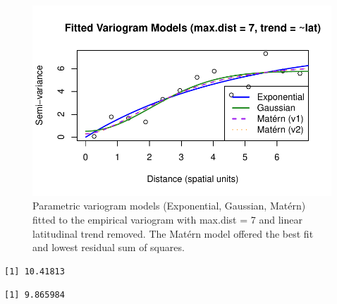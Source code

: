 \documentclass[
  11pt,
]{article}
\newenvironment{Shaded}{\begin{snugshade}}{\end{snugshade}}
\newcommand{\CommentTok}[1]{\textcolor[rgb]{0.37,0.37,0.37}{#1}}
\newcommand{\NormalTok}[1]{\textcolor[rgb]{0.00,0.23,0.31}{#1}}
\newcommand{\SpecialCharTok}[1]{\textcolor[rgb]{0.37,0.37,0.37}{#1}}
\begin{document}
\begin{figure}[H]

{\centering \includegraphics{project_files/figure-pdf/fig-variogfit-1.pdf}

}

\caption{Parametric variogram models (Exponential, Gaussian, Matérn)
fitted to the empirical variogram with max.dist = 7 and linear
latitudinal trend removed. The Matérn model offered the best fit and
lowest residual sum of squares.}

\end{figure}%

\begin{Shaded}
\end{Shaded}

\begin{verbatim}
[1] 10.41813
\end{verbatim}

\begin{Shaded}
\end{Shaded}

\begin{verbatim}
[1] 9.865984
\end{verbatim}

\begin{Shaded}
\end{Shaded}
\end{document}
